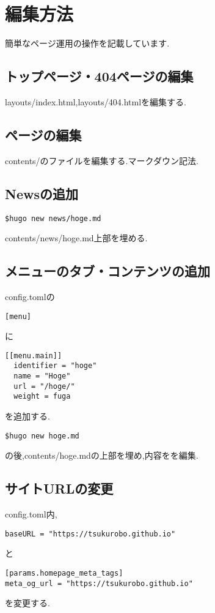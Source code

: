 \section{編集方法}
簡単なページ運用の操作を記載しています.

\subsection{トップページ・404ページの編集}
layouts/index.html,layouts/404.htmlを編集する.

\subsection{ページの編集}
contents/のファイルを編集する.マークダウン記法.

\subsection{Newsの追加}
\begin{lstlisting}[]
  $hugo new news/hoge.md
\end{lstlisting}

contents/news/hoge.md上部を埋める.

\subsection{メニューのタブ・コンテンツの追加}
config.tomlの
\begin{lstlisting}[]
  [menu]
\end{lstlisting}
に
\begin{lstlisting}[]
[[menu.main]]
  identifier = "hoge"
  name = "Hoge"
  url = "/hoge/"
  weight = fuga
\end{lstlisting}
を追加する.

\begin{lstlisting}[]
  $hugo new hoge.md
\end{lstlisting}
の後,contents/hoge.mdの上部を埋め,内容をを編集.

\subsection{サイトURLの変更}
config.toml内,
\begin{lstlisting}[]
baseURL = "https://tsukurobo.github.io"
\end{lstlisting}
と
\begin{lstlisting}[]
[params.homepage_meta_tags]
meta_og_url = "https://tsukurobo.github.io"
\end{lstlisting}
を変更する.

